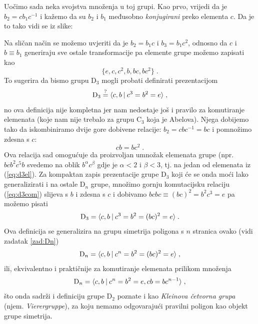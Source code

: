 Uočimo sada neka svojstva množenja u toj grupi. Kao prvo, vrijedi
da je $b_2 = c b_1 c^{-1}$ i kažemo da su $b_2$ i $b_1$ međusobno
\emph{konjugirani} preko elementa $c$. Da je to tako vidi
se iz slike: 

\centerline{}

Na sličan način se možemo uvjeriti da je $b_2 = b_1 c $
i $b_3 = b_1 c^2 $, odnosno da 
$c$ i $b\equiv b_1$ generiraju sve ostale transformacije pa
elemente grupe možemo zapisati kao
\begin{equation}
 \{e,c,c^2,b,bc,bc^2\} \;.
\label{eq:d3el}
\end{equation}
To sugerira da bismo grupu D$_3$ mogli probati definirati prezentacijom
\begin{equation}
    {\rm D}_3 \stackrel{?}{=} \langle c, b \: | \: c^3 = b^2 = e \rangle \;,
\label{eq:d3gp1}
\end{equation}
no ova definicija nije kompletna jer nam nedostaje još
i pravilo za komutiranje elemenata (koje nam nije trebalo
za grupu C$_3$ koja je Abelova). Njega dobijemo tako da
iskombiniramo dvije gore dobivene relacije: 
$b_2 = c b c^{-1} = b c$ i pomnožimo zdesna s $c$:
\begin{equation}
c b = b c^2  \;.
\label{eq:d3com}
\end{equation}
Ova relacija sad omogućuje da proizvoljan umnožak elemenata
grupe (npr. $b c b^2 c^5 b$ svedemo na oblik $b^\alpha c^\beta$ gdje
je $\alpha<2$ i $\beta<3$, tj. na jedan od elemenata iz (\ref{eq:d3el}).
Za kompaktan zapis prezentacije grupe D$_3$ koji će se onda moći
lako generalizirati i na ostale D$_n$ grupe, množimo gornju
komutacijsku relaciju (\ref{eq:d3com}) slijeva s $b$ i zdesna s $c$
i dobivamo  $ bcbc \equiv (bc)^2 = b^2 c^3 = e$ pa možemo
pisati
\begin{equation}
 {\rm D}_3= \langle c,b \: | \: c^3 = b^2 = (bc)^2 = e \rangle \;.
\label{eq:d3gp}
\end{equation}
Ova definicija se generalizira na grupu simetrija poligona s $n$
stranica ovako (vidi zadatak \ref{zad:Dn})
\begin{equation}
 {\rm D}_n= \langle c,b \: | \: c^n = b^2 = (bc)^2 = e \rangle \;,
\label{eq:dngp}
\end{equation}
ili, ekvivalentno i praktičnije za komutiranje elemenata prilikom množenja
\begin{equation}
    {\rm D}_n= \langle c,b \: | \: c^n = b^2 = e, cb = b c^{n-1} \rangle \;,
\label{eq:dngpcom}
\end{equation}
što onda sadrži i definiciju grupe
D$_2$ poznate i kao
\emph{Kleinova četvorna grupa} (njem. \emph{Vierergruppe}), 
 
za koju nemamo odgovarajući pravilni poligon kao objekt grupe simetrija.


